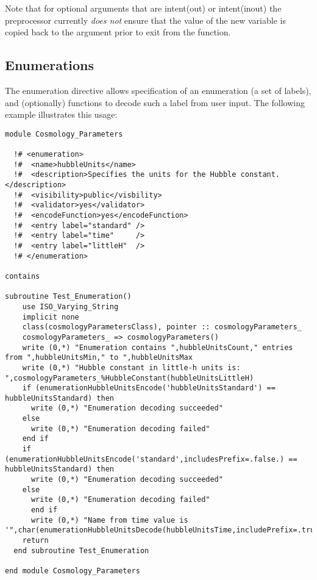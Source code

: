 Note that for optional arguments that are {\normalfont \ttfamily intent(out)} or {\normalfont \ttfamily intent(inout)} the preprocessor currently \emph{does not} ensure that the value of the new variable is copied back to the argument prior to exit from the function.

\subsection{Enumerations}

The {\normalfont \ttfamily enumeration} directive allows specification of an enumeration (a set of labels), and (optionally) functions to decode such a label from user input. The following example illustrates this usage:

\begin{lstlisting}
module Cosmology_Parameters

  !# <enumeration>
  !#  <name>hubbleUnits</name>
  !#  <description>Specifies the units for the Hubble constant.</description>
  !#  <visibility>public</visbility>
  !#  <validator>yes</validator>
  !#  <encodeFunction>yes</encodeFunction>
  !#  <entry label="standard" />
  !#  <entry label="time"     />
  !#  <entry label="littleH"  />
  !# </enumeration>

contains

subroutine Test_Enumeration()
    use ISO_Varying_String
    implicit none
    class(cosmologyParametersClass), pointer :: cosmologyParameters_
    cosmologyParameters_ => cosmologyParameters()
    write (0,*) "Enumeration contains ",hubbleUnitsCount," entries from ",hubbleUnitsMin," to ",hubbleUnitsMax
    write (0,*) "Hubble constant in little-h units is: ",cosmologyParameters_%HubbleConstant(hubbleUnitsLittleH)
    if (enumerationHubbleUnitsEncode('hubbleUnitsStandard') == hubbleUnitsStandard) then
      write (0,*) "Enumeration decoding succeeded"
    else
      write (0,*) "Enumeration decoding failed"
    end if
    if (enumerationHubbleUnitsEncode('standard',includesPrefix=.false.) == hubbleUnitsStandard) then
      write (0,*) "Enumeration decoding succeeded"
    else
      write (0,*) "Enumeration decoding failed"
      end if
      write (0,*) "Name from time value is '",char(enumerationHubbleUnitsDecode(hubbleUnitsTime,includePrefix=.true.)),"'"
    return
  end subroutine Test_Enumeration

end module Cosmology_Parameters
\end{lstlisting}

